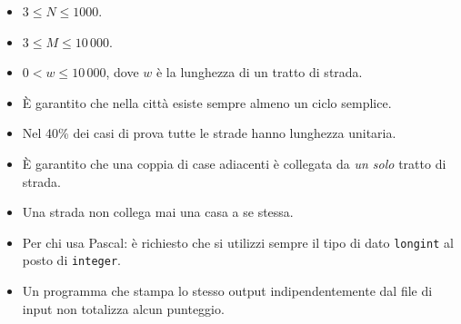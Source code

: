 \Constraints

\begin{itemize}[nolistsep, itemsep=2mm]
	\item $3 \le N \le 1000$.
	\item $3 \le M \le 10\,000$.
	\item $0 < w \le 10\,000$, dove $w$ è la lunghezza di un tratto di strada.
	\item È garantito che nella città esiste sempre almeno un ciclo semplice.
	\item Nel 40\% dei casi di prova tutte le strade hanno lunghezza unitaria.
	\item È garantito che una coppia di case adiacenti è collegata da \emph{un solo} tratto di strada.
	\item Una strada non collega mai una casa a se stessa.
\end{itemize}


\Examples

\begin{example}
%
\end{example}

\Notes
\begin{itemize}[nolistsep, itemsep=2mm]
	\item Per chi usa Pascal: è richiesto che si utilizzi sempre il tipo di dato \verb|longint| al posto di \verb|integer|.
	\item Un programma che stampa lo stesso output indipendentemente dal file di input non totalizza alcun punteggio.
\end{itemize}


\newpage
\begin{solution}
    
\end{solution}
